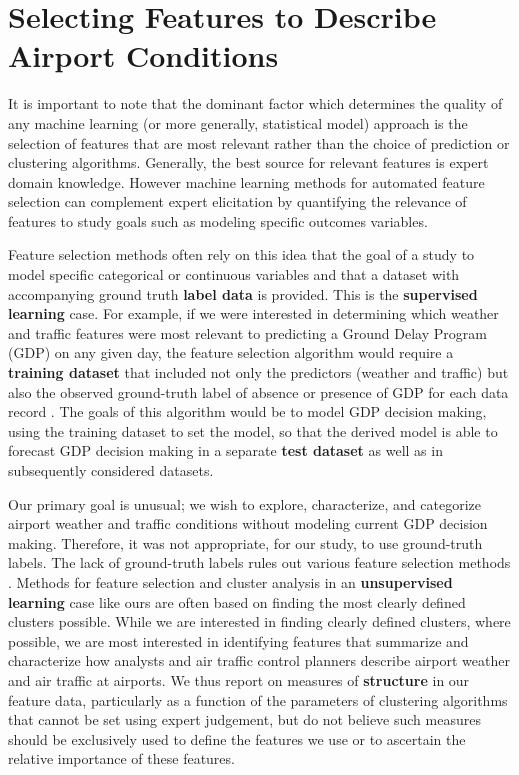 \documentclass[11pt]{scrartcl}
\begin{document}
\section{Selecting Features to Describe Airport Conditions}
It is important to note that the dominant factor which determines the quality of any machine learning (or more generally, statistical model) approach is the selection of features that are most relevant rather than the choice of prediction or clustering algorithms.  Generally, the best source for relevant features is expert domain knowledge.  However machine learning methods for automated feature selection can complement expert elicitation by quantifying the relevance of  features to study goals such as modeling specific outcomes variables.

Feature selection methods often rely on this idea that the goal of a study to model specific categorical or continuous variables and that a dataset with accompanying ground truth {\bf label data} is provided.  This is the {\bf supervised learning} case.  For example, if we were interested in determining which weather and traffic features were most relevant to predicting a Ground Delay Program (GDP) on any given day, the feature selection algorithm would require a {\bf training dataset} that included not only the predictors (weather and traffic) but also the observed ground-truth label of absence or presence of GDP for each data record \cite{mukherjeepredicting}.  The goals of this algorithm would be to model GDP decision making, using the training dataset to set the model, so that the derived model is able to forecast GDP decision making in a separate {\bf test dataset} as well as in subsequently considered datasets.

Our primary goal is unusual; we wish to explore, characterize, and categorize airport weather and traffic conditions without modeling current GDP decision making.  Therefore, it was not appropriate, for our study, to use ground-truth labels.  The lack of ground-truth labels rules out various feature selection methods \cite{guyon2003introduction}.  Methods for feature selection and cluster analysis in an {\bf unsupervised learning} case like ours are often based on finding the most clearly defined clusters possible.  While we are interested in finding clearly defined clusters, where possible, we are most interested in identifying features that summarize and characterize how analysts and air traffic control planners describe airport weather and air traffic at airports.  We thus report on measures of {\bf structure} in our feature data, particularly as a function of the parameters of clustering algorithms that cannot be set using expert judgement, but do not believe such measures should be exclusively used to define the features we use or to ascertain the relative importance of these features.
\end{document}

